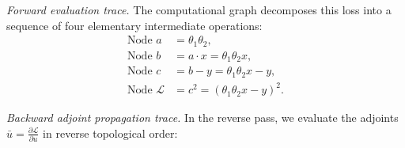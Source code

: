 \documentclass[../../main.tex]{subfiles}
\begin{document}
\textit{Forward evaluation trace.} The computational graph decomposes this loss into a sequence of four elementary intermediate operations:
\begin{align}
\text{Node } a &= \theta_1 \theta_2, \label{eq:trace_fwd_a} \\
\text{Node } b &= a \cdot x = \theta_1 \theta_2 x, \label{eq:trace_fwd_b} \\
\text{Node } c &= b - y = \theta_1 \theta_2 x - y, \label{eq:trace_fwd_c} \\
\text{Node } \mathcal{L} &= c^2 = \left( \theta_1 \theta_2 x - y \right)^2. \label{eq:trace_fwd_L}
\end{align}

\textit{Backward adjoint propagation trace.} In the reverse pass, we evaluate the adjoints $\bar{u} = \frac{\partial \mathcal{L}}{\partial u}$ in reverse topological order:
\end{document}
